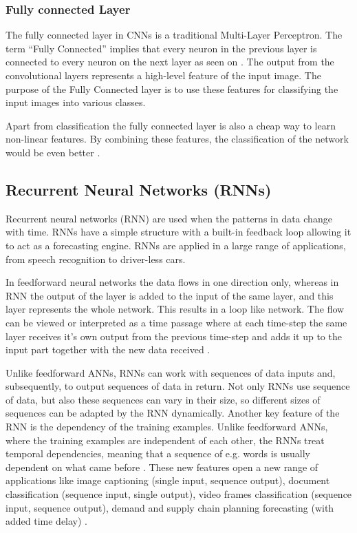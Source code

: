 \subsubsection{Fully connected Layer}
The fully connected layer in CNNs is a traditional Multi-Layer Perceptron. The term “Fully Connected” implies that every neuron in the previous layer is connected to every neuron on the next layer as seen on . The output from the convolutional layers represents a high-level feature of the input image. The purpose of the Fully Connected layer is to use these features for classifying the input images into various classes. 

Apart from classification the fully connected layer is also a cheap way to learn non-linear features. By combining these features, the classification of the network would be even better \cite{Fully_Connected_Layer}.

\subsection{Recurrent Neural Networks (RNNs)} \label{RNN}
Recurrent neural networks (RNN) are used when the patterns in data change with time. RNNs have a simple structure with a built-in feedback loop allowing it to act as a forecasting engine. RNNs are applied in a large range of applications, from speech recognition to driver-less cars. 

In feedforward neural networks the data flows in one direction only, whereas in RNN the output of the layer is added to the input of the same layer, and this layer represents the whole network. This results in a loop like network. The flow can be viewed or interpreted as a time passage where at each time-step the same layer receives it's own output from the previous time-step and adds it up to the input part together with the new data received \cite{RNNvideo}. 

Unlike feedforward ANNs, RNNs can work with sequences of data inputs and, subsequently, to output sequences of data in return. Not only RNNs use sequence of data, but also these sequences can vary in their size, so different sizes of sequences can be adapted by the RNN dynamically. Another key feature of the RNN is the dependency of the training examples. Unlike feedforward ANNs, where the training examples are independent of each other, the RNNs treat temporal dependencies, meaning that a sequence of e.g. words is usually dependent on what came before \cite{NeonRNN}. These new features open a new range of applications like image captioning (single input, sequence output), document classification (sequence input, single output), video frames classification (sequence input, sequence output), demand and supply chain planning forecasting (with added time delay) \cite{RNNvideo}.


